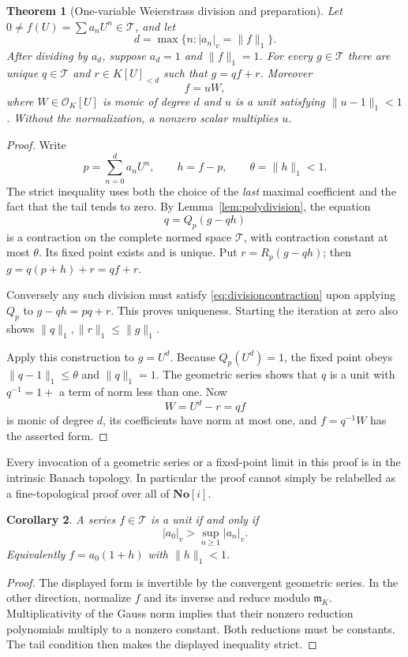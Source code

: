 \documentclass[11pt,a4paper]{article}
\numberwithin{equation}{section}
\newtheorem{theorem}{Theorem}[section]
\newtheorem{corollary}[theorem]{Corollary}
\theoremstyle{definition}
\theoremstyle{remark}
\newcommand{\No}{\mathbf{No}}
\newcommand{\OO}{\mathcal O}
\newcommand{\mm}{\mathfrak m}
\newcommand{\TT}{\mathcal T}
\newcommand{\vabs}[1]{\lvert#1\rvert_v}
\newcommand{\Gauss}[2]{\lVert#1\rVert_{#2}}
\begin{document}
\begin{theorem}[One-variable Weierstrass division and preparation]
\label{thm:preparation}
Let $0\ne f(U)=\sum a_nU^n\in\TT$, and let
\[
 d=\max\{n:\vabs{a_n}=\Gauss f1\}.
\]
After dividing by $a_d$, suppose $a_d=1$ and $\Gauss f1=1$.
For every $g\in\TT$ there are unique $q\in\TT$ and $r\in K[U]_{<d}$ such
that $g=qf+r$. Moreover
\begin{equation}\label{eq:preparation}
 f=uW,
\end{equation}
where $W\in\OO_K[U]$ is monic of degree $d$ and $u$ is a unit satisfying
$\Gauss{u-1}1<1$. Without the normalization, a nonzero scalar multiplies $u$.
\end{theorem}
\begin{proof}
Write
\[
 p=\sum_{n=0}^d a_nU^n,
 \qquad h=f-p,
 \qquad \theta=\Gauss h1<1.
\]
The strict inequality uses both the choice of the \emph{last} maximal
coefficient and the fact that the tail tends to zero. By
Lemma~\ref{lem:polydivision}, the equation
\begin{equation}\label{eq:divisioncontraction}
 q=Q_p(g-qh)
\end{equation}
is a contraction on the complete normed space $\TT$, with contraction constant
at most $\theta$. Its fixed point exists and is unique. Put $r=R_p(g-qh)$;
then $g=q(p+h)+r=qf+r$.

Conversely any such division must satisfy \eqref{eq:divisioncontraction} upon
applying $Q_p$ to $g-qh=pq+r$. This proves uniqueness. Starting the iteration
at zero also shows $\Gauss q1,\Gauss r1\le\Gauss g1$.

Apply this construction to $g=U^d$. Because $Q_p(U^d)=1$, the fixed point obeys
$\Gauss{q-1}1\le\theta$ and $\Gauss q1=1$. The geometric series shows that
$q$ is a unit with $q^{-1}=1+$ a term of norm less than one. Now
\[
 W=U^d-r=qf
\]
is monic of degree $d$, its coefficients have norm at most one, and
$f=q^{-1}W$ has the asserted form.
\end{proof}

Every invocation of a geometric series or a fixed-point limit in this proof is
in the intrinsic Banach topology. In particular the proof cannot simply be
relabelled as a fine-topological proof over all of $\No[i]$.

\begin{corollary}\label{cor:units}
A series $f\in\TT$ is a unit if and only if
\[
 \vabs{a_0}>\sup_{n\ge1}\vabs{a_n}.
\]
Equivalently $f=a_0(1+h)$ with $\Gauss h1<1$.
\end{corollary}
\begin{proof}
The displayed form is invertible by the convergent geometric series. In the
other direction, normalize $f$ and its inverse and reduce modulo $\mm_K$.
Multiplicativity of the Gauss norm implies that their nonzero reduction
polynomials multiply to a nonzero constant. Both reductions must be constants.
The tail condition then makes the displayed inequality strict.
\end{proof}
\end{document}
